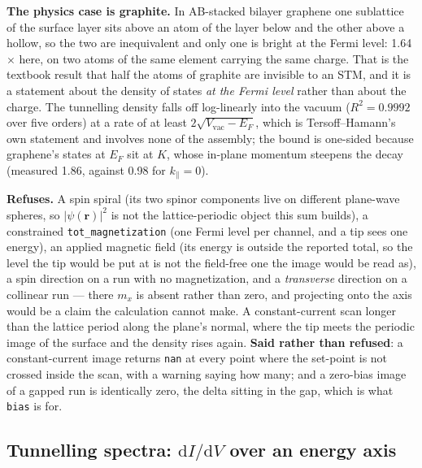 \documentclass[11pt,a4paper]{article}
\newcommand{\code}[1]{\texttt{\small #1}}
\begin{document}
\textbf{The physics case is graphite.} In AB-stacked bilayer graphene one
sublattice of the surface layer sits above an atom of the layer below and the
other above a hollow, so the two are inequivalent and only one is bright at the
Fermi level: 1.64$\times$ here, on two atoms of the same element carrying the
same charge. That is the textbook result that half the atoms of graphite are
invisible to an STM, and it is a statement about the density of states \emph{at
the Fermi level} rather than about the charge. The tunnelling density falls off
log-linearly into the vacuum ($R^2 = 0.9992$ over five orders) at a rate of at
least $2\sqrt{V_{\mathrm{vac}} - E_F}$, which is Tersoff--Hamann's own statement
and involves none of the assembly; the bound is one-sided because graphene's
states at $E_F$ sit at $K$, whose in-plane momentum steepens the decay
(measured 1.86, against 0.98 for $k_\parallel = 0$).

\begin{refuses}
\textbf{Refuses.} A spin spiral (its two spinor components live on different
plane-wave spheres, so $|\psi(\mathbf r)|^2$ is not the lattice-periodic object
this sum builds), a constrained \code{tot\_magnetization} (one Fermi level per
channel, and a tip sees one energy), an applied magnetic field (its energy is
outside the reported total, so the level the tip would be put at is not the
field-free one the image would be read as), a spin direction on a run with no
magnetization, and a \emph{transverse} direction on a collinear run --- there
$m_x$ is absent rather than zero, and projecting onto the axis would be a claim
the calculation cannot make. A constant-current scan longer than the lattice
period along the plane's normal, where the tip meets the periodic image of the
surface and the density rises again.
\textbf{Said rather than refused}: a constant-current image returns \code{nan}
at every point where the set-point is not crossed inside the scan, with a
warning saying how many; and a zero-bias image of a gapped run is identically
zero, the delta sitting in the gap, which is what \code{bias} is for.
\end{refuses}

\subsection{Tunnelling spectra: $\mathrm{d}I/\mathrm{d}V$ over an energy axis}
\end{document}
